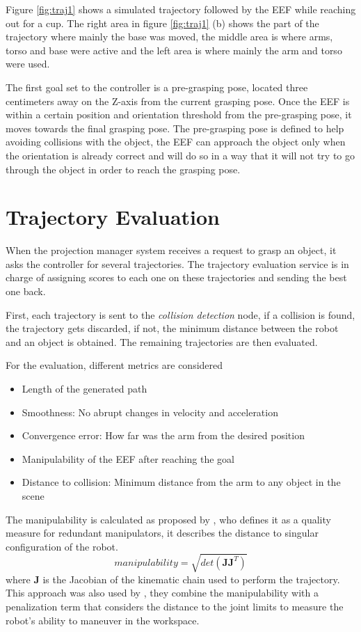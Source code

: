 Figure \ref{fig:traj1} shows a simulated trajectory followed by the EEF while reaching out for a cup. The right area in figure \ref{fig:traj1} (b) shows the part of the trajectory where mainly the base was moved, the middle area is where arms, torso and base were active and the left area is where mainly the arm and torso were used.

The first goal set to the controller is a pre-grasping pose, located three centimeters away on the Z-axis from the current grasping pose. Once the EEF is within a certain position and orientation threshold from the  pre-grasping pose, it moves towards the final grasping pose. The pre-grasping pose is defined to help avoiding collisions with the object, the EEF can approach the object only when the orientation is already correct and will do so in a way that it will not try to go through the object in order to reach the grasping pose.

\section{Trajectory Evaluation}
\label{sec:traj_eval}

When the projection manager system receives a request to grasp an object, it asks the controller for several trajectories. The trajectory evaluation service is in charge of assigning scores to each one on these trajectories and sending the best one back.

First, each trajectory is sent to the \textit{collision detection} node, if a collision is found, the trajectory gets discarded, if not, the minimum distance between the robot and an object is obtained. The remaining trajectories are then evaluated.

For the evaluation, different metrics are considered
\begin{itemize}
	\item Length of the generated path
	\item Smoothness: No abrupt changes in velocity and acceleration
	\item Convergence error: How far was the arm from the desired position
	\item Manipulability of the EEF after reaching the goal
	\item Distance to collision: Minimum distance from the arm to any object in the scene
\end{itemize}


The manipulability is calculated as proposed by \cite{Yoshikawa}, who defines it as a quality measure for redundant manipulators, it describes the distance to singular configuration of the robot.
$$
manipulability = \sqrt{det(\textbf{JJ}^{T})}
$$
where $\textbf{J}$ is the Jacobian of the kinematic chain used to perform the trajectory. This approach was also used by \cite{manip_analysis}, they combine the manipulability with a penalization term that considers the distance to the joint limits to measure the robot's ability to maneuver in the workspace.

